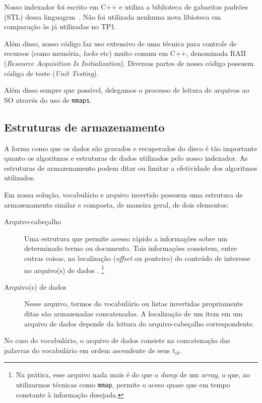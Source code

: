 \documentclass[10pt,twocolumn]{article}
\begin{document}
Nosso indexador foi escrito em C++
e utiliza a biblioteca de gabaritos padrões (STL) dessa
linguagem~\cite{stroustrup97}.
Não foi utilizada nenhuma nova libioteca em comparação às já utilizadas
no TP1.

Além disso, nosso código faz uso extensivo de uma técnica para controle
de recursos (como memória, \emph{locks} etc)  muito comum em C++,
denominada RAII (\emph{Resource Acquisition Is Initialization}).
Diversas partes de nosso código possuem código de teste (\emph{Unit
Testing}).

Além disso sempre que possível, delegamos o processo de leitura de
arquivos ao SO através do uso de \texttt{mmaps}.

\subsection{Estruturas de armazenamento}\label{sec:storage}

A forma como que os dados são gravados e recuperados do disco é
tão importante quanto os algoritmos e estruturas de dados utilizados
pelo nosso indexador. As estruturas de armazenamento podem ditar ou
limitar a efetividade dos algoritmos utilizados.

Em nossa solução, vocabulário e arquivo invertido possuem uma estrutura
de armazenamento similar e composta, de maneira geral, de dois
elementos:
\begin{description}

\item[Arquivo-cabeçalho] Uma estrutura que permite acesso rápido a
informações sobre um determinado termo ou documento.  Tais informações
consistem, entre outras coisas, na localização (\emph{offset} ou
ponteiro) do conteúdo de interesse no arquivo(s) de dados . \footnote{
Na prática, esse arquivo nada mais é do que o \emph{dump} de um
\emph{array}, o que, ao utilizarmos técnicas como \texttt{mmap}, permite
o aceso quase que em tempo constante à informação desejada.}

\item[Arquivo(s) de dados] Nesse arquivo, termos do vocabulário ou listas
invertidas propriamente ditas são armazenadas concatenadas. A
localização de um item em um arquivo de dados depende da leitura do
arquivo-cabeçalho correspondente.
\end{description}

No caso do vocabulário, o arquivo de dados consiste na concatenação das
palavras do vocabulário em ordem ascendente de seus \(t_{id}\).
\end{document}
